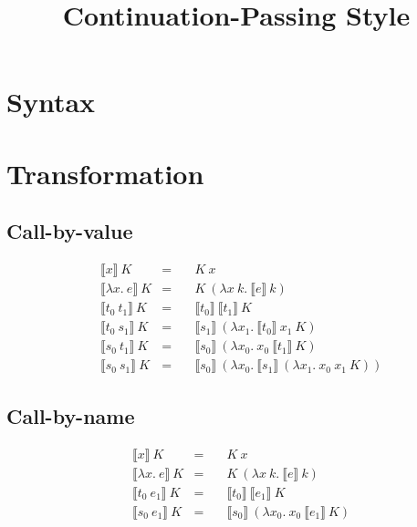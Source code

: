 
\usepackage{graphicx}
\usepackage{mdframed}
\usepackage{stmaryrd}

\newcommand\fun\lambda
\newcommand{\K}[1]{\llbracket #1\rrbracket}
\newcommand{\kdef}[2]{&\K{#1}~K&=\quad&#2}

\title{Continuation-Passing Style}
\date{}


\maketitle

\section*{Syntax}
\begin{figure}[h]
\begin{mdframed}
\ottmetavars

\ottgrammar
\end{mdframed}
\end{figure}

\section*{Transformation}
\subsection*{Call-by-value}
\begin{align*}
\kdef{x}{K~x}\\
\kdef{\fun x.~e}{K~(\fun x~k.~\K{e}~k)}\\
\kdef{t_0~t_1}{\K{t_0}~\K{t_1}~K}\\
\kdef{t_0~s_1}{\K{s_1}~(\fun x_1.~\K{t_0}~x_1~K)}\\
\kdef{s_0~t_1}{\K{s_0}~(\fun x_0.~x_0~\K{t_1}~K)}\\
\kdef{s_0~s_1}{\K{s_0}~(\fun x_0.~\K{s_1}~(\fun x_1.~x_0~x_1~K))}
\end{align*}

\subsection*{Call-by-name}
\begin{align*}
\kdef{x}{K~x}\\
\kdef{\fun x.~e}{K~(\fun x~k.~\K{e}~k)}\\
\kdef{t_0~e_1}{\K{t_0}~\K{e_1}~K}\\
\kdef{s_0~e_1}{\K{s_0}~(\fun x_0.~x_0~\K{e_1}~K)}
\end{align*}

